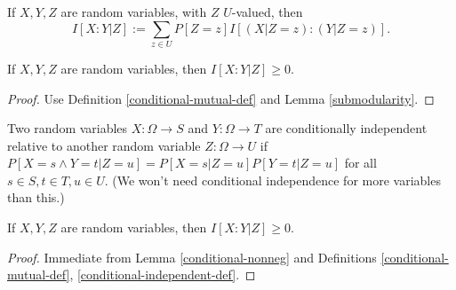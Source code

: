 \begin{definition}\label{conditional-mutual-def}  If $X,Y,Z$ are random variables, with $Z$ $U$-valued, then
  $$ I[X:Y|Z] := \sum_{z \in U} P[Z=z] I[(X|Z=z): (Y|Z=z)].$$
\end{definition}

\begin{lemma}\label{conditional-nonneg}  
If $X,Y,Z$ are random variables, then $I[X:Y|Z] \ge 0$.
\end{lemma}

\begin{proof}  Use Definition \ref{conditional-mutual-def} and Lemma \ref{submodularity}.
\end{proof}

\begin{definition}\label{conditional-independent-def}
  Two random variables $X: \Omega \to S$ and $Y: \Omega \to T$ are conditionally independent relative to another random variable $Z: \Omega \to U$ if $P[ X = s \wedge Y = t| Z=u] = P[X=s|Z=u] P[Y=t|Z=u]$ for all $s \in S, t \in T, u \in U$.  (We won't need conditional independence for more variables than this.)
\end{definition}

\begin{lemma}\label{conditional-vanish}  
  If $X,Y,Z$ are random variables, then $I[X:Y|Z] \ge 0$.
\end{lemma}

\begin{proof}  Immediate from Lemma \ref{conditional-nonneg} and Definitions \ref{conditional-mutual-def}, \ref{conditional-independent-def}.
\end{proof}
